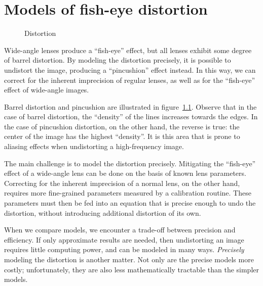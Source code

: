 \documentclass[english,12pt]{ifimaster}
\begin{document}

\chapter{Models of fish-eye distortion}
\label{chap:models}

\begin{figure}[b]
  \centering
  \qquad{}

  \caption{Distortion}
  \label{fig:distortion}
\end{figure}

Wide-angle lenses produce a ``fish-eye'' effect, but all lenses
exhibit some degree of barrel distortion. By modeling the distortion
precisely, it is possible to undistort the image, producing a
``pincushion'' effect instead. In this way, we can correct for the
inherent imprecision of regular lenses, as well as for the
``fish-eye'' effect of wide-angle images.

Barrel distortion and pincushion are illustrated in
figure~\ref{fig:distortion}. Observe that in the case of barrel
distortion, the ``density'' of the lines increases towards the edges.
In the case of pincushion distortion, on the other hand, the reverse
is true: the center of the image has the highest ``density''. It is
this area that is prone to aliasing effects when undistorting a
high-frequency image.

The main challenge is to model the distortion precisely. Mitigating
the ``fish-eye'' effect of a wide-angle lens can be done on the basis
of known lens parameters. Correcting for the inherent imprecision of a
normal lens, on the other hand, requires more fine-grained parameters
measured by a calibration routine. These parameters must then be fed
into an equation that is precise enough to undo the distortion,
without introducing additional distortion of its own.

When we compare models, we encounter a trade-off between precision and
efficiency. If only approximate results are needed, then undistorting
an image requires little computing power, and can be modeled in many
ways. \emph{Precisely} modeling the distortion is another matter. Not
only are the precise models more costly; unfortunately, they are also
less mathematically tractable than the simpler models.
\end{document}
